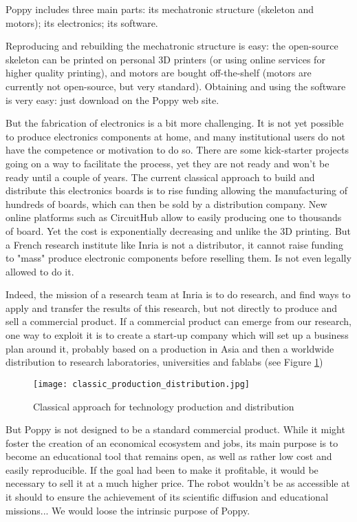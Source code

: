 Poppy includes three main parts: its mechatronic structure (skeleton and motors); its electronics; its software.

Reproducing and rebuilding the mechatronic structure is easy: the open-source skeleton can be printed on personal 3D printers (or using online services for higher quality printing), and motors are bought off-the-shelf (motors are currently not open-source, but very standard). Obtaining and using the software is very easy: just download on the Poppy web site.

But the fabrication of electronics is a bit more challenging. It is not yet possible to produce electronics components at home, and many institutional users do not have the competence or motivation to do so. There are some kick-starter projects going on a way to facilitate the process, yet they are not ready and won't be ready until a couple of years. The current classical approach to build and distribute this electronics boards is to rise funding allowing the manufacturing of hundreds of boards, which can then be sold by a distribution company. New online platforms such as CircuitHub allow to easily producing one to thousands of board. Yet the cost is exponentially decreasing and unlike the 3D printing. But a French research institute like Inria is not a distributor, it cannot raise funding to "mass" produce electronic components before reselling them. Is not even legally allowed to do it.

Indeed, the mission of a research team at Inria is to do research, and find ways to apply and transfer the results of this research, but not directly to produce and sell a commercial product. If a commercial product can emerge from our research, one way to exploit it is to create a start-up company which will set up a business plan around it, probably based on a production in Asia and then a worldwide distribution to research laboratories, universities and fablabs (see Figure \ref{fig:classic})

\begin{figure}[ht]
    \begin{center}
        \texttt{[image: classic\_production\_distribution.jpg]}
    \end{center}
    \caption{Classical approach for technology production and distribution}
    \label{fig:classic}
\end{figure}

But Poppy is not designed to be a standard commercial product. While it might foster the creation of an economical ecosystem and jobs, its main purpose is to become an educational tool that remains open, as well as rather low cost and easily reproducible. If the goal had been to make it profitable, it would be necessary to sell it at a much higher price. The robot wouldn't be as accessible at it should to ensure the achievement of its scientific diffusion and educational missions... We would loose the intrinsic purpose of Poppy.

